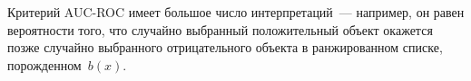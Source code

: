 \documentclass[12pt,fleqn]{article}
\begin{document}
Критерий AUC-ROC имеет большое число интерпретаций~--- например,
он равен вероятности того, что случайно выбранный положительный объект
окажется позже случайно выбранного отрицательного объекта в ранжированном
списке, порожденном~$b(x)$.



\end{document}
